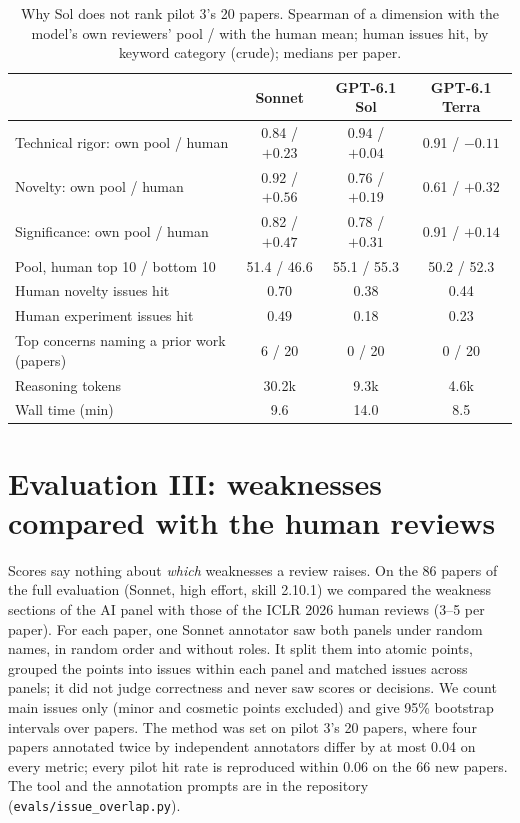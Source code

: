 \documentclass[11pt,a4paper]{article}
\begin{document}
\begin{table}[h]
\centering
\small
\caption{Why Sol does not rank pilot 3's 20 papers. Spearman of a dimension with the model's own
reviewers' pool / with the human mean; human issues hit, by keyword category (crude); medians per
paper.}\label{tab:soldiag}
\begin{tabular}{lccc}
\toprule
 & Sonnet & GPT-6.1 Sol & GPT-6.1 Terra\\
\midrule
Technical rigor: own pool / human & 0.84 / $+0.23$ & $\mathbf{0.94}$ / $+0.04$ & 0.91 / $-0.11$\\
Novelty: own pool / human & $\mathbf{0.92}$ / $\mathbf{+0.56}$ & 0.76 / $+0.19$ & 0.61 / $+0.32$\\
Significance: own pool / human & 0.82 / $+0.47$ & 0.78 / $+0.31$ & 0.91 / $+0.14$\\
Pool, human top 10 / bottom 10 & 51.4 / 46.6 & 55.1 / 55.3 & 50.2 / 52.3\\
Human novelty issues hit & $\mathbf{0.70}$ & 0.38 & 0.44\\
Human experiment issues hit & $\mathbf{0.49}$ & 0.18 & 0.23\\
Top concerns naming a prior work (papers) & 6 / 20 & 0 / 20 & 0 / 20\\
Reasoning tokens & 30.2k & 9.3k & 4.6k\\
Wall time (min) & 9.6 & 14.0 & 8.5\\
\bottomrule
\end{tabular}
\end{table}

\section{Evaluation III: weaknesses compared with the human reviews}\label{sec:overlap}
Scores say nothing about \emph{which} weaknesses a review raises. On the 86 papers of the full
evaluation (Sonnet, high effort, skill 2.10.1) we compared the weakness sections of the AI panel
with those of the ICLR 2026 human reviews (3--5 per paper). For each paper, one Sonnet annotator
saw both panels under random names, in random order and without roles. It split them into atomic
points, grouped the points into issues within each panel and matched issues across panels; it did
not judge correctness and never saw scores or decisions. We count main issues only (minor and
cosmetic points excluded) and give 95\% bootstrap intervals over papers. The method was set on
pilot 3's 20 papers, where four papers annotated twice by independent annotators differ by at most
0.04 on every metric; every pilot hit rate is reproduced within 0.06 on the 66 new papers. The
tool and the annotation prompts are in the repository (\texttt{evals/issue\_overlap.py}).
\end{document}
